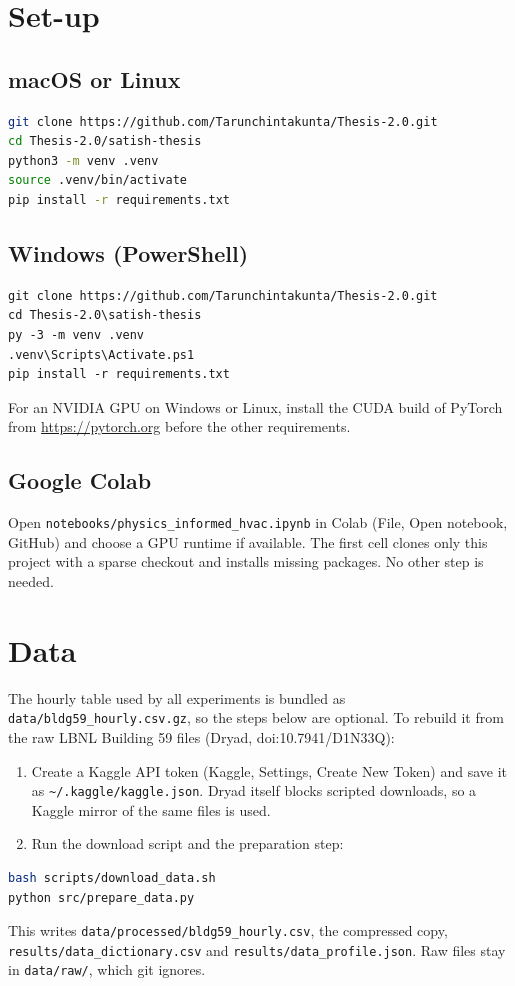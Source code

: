 \documentclass[11pt,a4paper]{article}
\begin{document}
\section{Set-up}
\subsection{macOS or Linux}
\begin{lstlisting}[language=bash]
git clone https://github.com/Tarunchintakunta/Thesis-2.0.git
cd Thesis-2.0/satish-thesis
python3 -m venv .venv
source .venv/bin/activate
pip install -r requirements.txt
\end{lstlisting}

\subsection{Windows (PowerShell)}
\begin{lstlisting}
git clone https://github.com/Tarunchintakunta/Thesis-2.0.git
cd Thesis-2.0\satish-thesis
py -3 -m venv .venv
.venv\Scripts\Activate.ps1
pip install -r requirements.txt
\end{lstlisting}
For an NVIDIA GPU on Windows or Linux, install the CUDA build of PyTorch from \url{https://pytorch.org} before the other requirements.

\subsection{Google Colab}
Open \nolinkurl{notebooks/physics_informed_hvac.ipynb} in Colab (File, Open notebook, GitHub) and choose a GPU runtime if available. The first cell clones only this project with a sparse checkout and installs missing packages. No other step is needed.

\section{Data}
The hourly table used by all experiments is bundled as \nolinkurl{data/bldg59_hourly.csv.gz}, so the steps below are optional. To rebuild it from the raw LBNL Building 59 files (Dryad, doi:10.7941/D1N33Q):
\begin{enumerate}[nosep]
\item Create a Kaggle API token (Kaggle, Settings, Create New Token) and save it as \nolinkurl{~/.kaggle/kaggle.json}. Dryad itself blocks scripted downloads, so a Kaggle mirror of the same files is used.
\item Run the download script and the preparation step:
\end{enumerate}
\begin{lstlisting}[language=bash]
bash scripts/download_data.sh
python src/prepare_data.py
\end{lstlisting}
This writes \nolinkurl{data/processed/bldg59_hourly.csv}, the compressed copy, \nolinkurl{results/data_dictionary.csv} and \nolinkurl{results/data_profile.json}. Raw files stay in \nolinkurl{data/raw/}, which git ignores.
\end{document}
